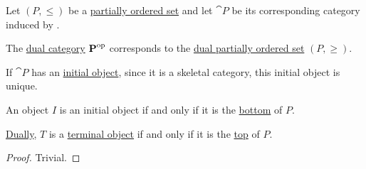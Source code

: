 \begin{proposition}\label{thm:order_category_isomorphism_properties}
  Let \( (P, \leq) \) be a \hyperref[def:partially_ordered_set]{partially ordered set} and let \( \cat{P} \) be its corresponding category induced by .

  \begin{thmenum}
     The \hyperref[def:dual_category]{dual category} \( \operatorname{\mathbf{P}}^{\operatorname{op}} \) corresponds to the \hyperref[def:partially_ordered_set/duality]{dual partially ordered set} \( (P, \geq) \).

     If \( \cat{P} \) has an \hyperref[def:universal_objects/initial]{initial object}, since it is a skeletal category, this initial object is unique.

    An object \( I \) is an initial object if and only if it is the \hyperref[def:semilattice/meet]{bottom} of \( P \).

    \hyperref[thm:categorical_principle_of_duality]{Dually}, \( T \) is a \hyperref[def:universal_objects/terminal]{terminal object} if and only if it is the \hyperref[def:semilattice/join]{top} of \( P \).
  \end{thmenum}
\end{proposition}
\begin{proof}
  Trivial.
\end{proof}
